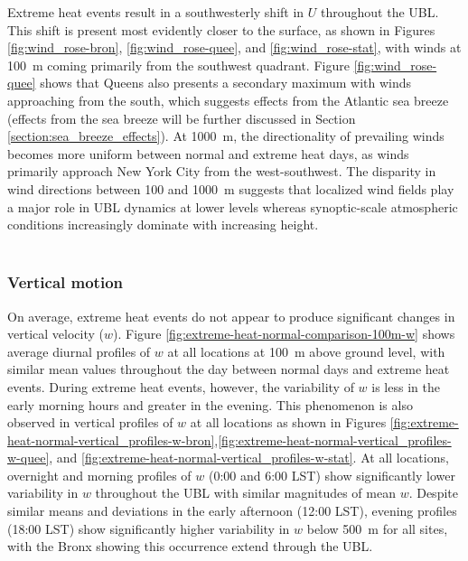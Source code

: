 \documentclass[11pt,a4paper]{article}
\begin{document}
Extreme heat events result in a southwesterly shift in $U$ throughout the UBL. This shift is present most evidently closer to the surface, as shown in Figures \ref{fig:wind_rose-bron}, \ref{fig:wind_rose-quee}, and \ref{fig:wind_rose-stat}, with winds at \SI{100}{\meter} coming primarily from the southwest quadrant. Figure \ref{fig:wind_rose-quee} shows that Queens also presents a secondary maximum with winds approaching from the south, which suggests effects from the Atlantic sea breeze (effects from the sea breeze will be further discussed in Section \ref{section:sea_breeze_effects}). At \SI{1000}{\meter}, the directionality of prevailing winds becomes more uniform between normal and extreme heat days, as winds primarily approach New York City from the west-southwest. The disparity in wind directions between 100 and \SI{1000}{\meter} suggests that localized wind fields play a major role in UBL dynamics at lower levels whereas synoptic-scale atmospheric conditions increasingly dominate with increasing height.
\\ \\
\subsubsection{Vertical motion}
On average, extreme heat events do not appear to produce significant changes in vertical velocity ($w$). Figure \ref{fig:extreme-heat-normal-comparison-100m-w} shows average diurnal profiles of $w$ at all locations at \SI{100}{\meter} above ground level, with similar mean values throughout the day between normal days and extreme heat events. During extreme heat events, however, the variability of $w$ is less in the early morning hours and greater in the evening. This phenomenon is also observed in vertical profiles of $w$ at all locations as shown in Figures \ref{fig:extreme-heat-normal-vertical_profiles-w-bron},\ref{fig:extreme-heat-normal-vertical_profiles-w-quee}, and \ref{fig:extreme-heat-normal-vertical_profiles-w-stat}. At all locations, overnight and morning profiles of $w$ (0:00 and 6:00 LST) show significantly lower variability in $w$ throughout the UBL with similar magnitudes of mean $w$. Despite similar means and deviations in the early afternoon (12:00 LST), evening profiles (18:00 LST) show significantly higher variability in $w$ below \SI{500}{\meter} for all sites, with the Bronx showing this occurrence extend through the UBL.

\end{document}
